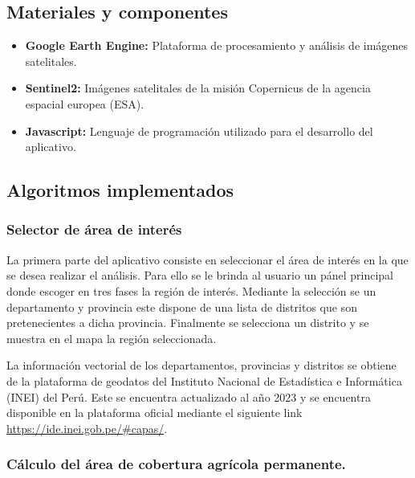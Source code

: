   \subsection{Materiales y componentes}

    \begin{itemize}
      \item \textbf{Google Earth Engine:} Plataforma de procesamiento y análisis de imágenes satelitales.
      \item \textbf{Sentinel2:} Imágenes satelitales de la misión Copernicus de la agencia espacial europea (ESA).
      \item \textbf{Javascript:} Lenguaje de programación utilizado para el desarrollo del aplicativo. 
    \end{itemize}

  \subsection{Algoritmos implementados}
  
      \subsubsection{\textbf{Selector de área de interés}}
      
      La primera parte del aplicativo consiste en seleccionar el área de interés en la que se desea realizar el análisis. Para ello se le brinda al usuario un pánel principal donde escoger en tres fases la región de interés. Mediante la selección se un departamento y provincia este dispone de una lista de distritos que son pretenecientes a dicha provincia. Finalmente se selecciona un distrito y se muestra en el mapa la región seleccionada.

      La información vectorial de los departamentos, provincias y distritos se obtiene de la plataforma de geodatos del Instituto Nacional de Estadística e Informática (INEI) del Perú. Este se encuentra actualizado al año 2023 y se encuentra disponible en la plataforma oficial mediante el siguiente link \href{https://ide.inei.gob.pe/#capas/}{https://ide.inei.gob.pe/\#capas/}.

      \subsubsection{\textbf{Cálculo del área de cobertura agrícola permanente.}}
      
